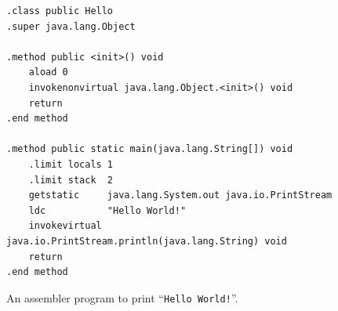 \begin{figure}[!ht]
\centering
\begin{verbatim}
.class public Hello
.super java.lang.Object

.method public <init>() void
    aload 0
    invokenonvirtual java.lang.Object.<init>() void
    return
.end method

.method public static main(java.lang.String[]) void
    .limit locals 1
    .limit stack  2
    getstatic     java.lang.System.out java.io.PrintStream
    ldc           "Hello World!"
    invokevirtual java.io.PrintStream.println(java.lang.String) void
    return
.end method
\end{verbatim}
\vspace*{-0.3cm}
\caption{An assembler program to print ``\texttt{Hello World!}''.}
\label{fig:Hello.jas}
\end{figure}

